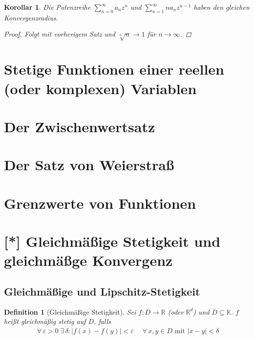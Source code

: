 \documentclass[11pt, twoside, a4paper]{article}
\theoremstyle{plain}
\newtheorem{definition}[blockelement]{Definition}
\newtheorem{korollar}[blockelement]{Korollar}
\newcommand{\abs}[1]{\left\lvert#1\right\rvert}
\newcommand{\fromto}{\rightarrow{}}
\newcommand{\sbset}{\subseteq}
\newcommand{\fa}{\;\forall\,}
\newcommand{\ex}{\;\exists\,}
\newcommand{\R}{\mathbb{R}}
\newcommand{\K}{\mathbb{K}}
\begin{document}
    \begin{korollar}
        Die Potenzreihe $ \sum_{n=0}^{\infty} a_n z^n$ und $ \sum_{n=1}^{\infty} n a_n z^{n-1}$ haben den gleichen Konvergenzradius.
        \begin{proof}
            Folgt mit vorherigem Satz und $\sqrt[n]{n}\fromto 1$ für $n\fromto\infty$.
        \end{proof}
    \end{korollar}

    \newpage


    \section{Stetige Funktionen einer reellen (oder komplexen) Variablen}
    


    \section{Der Zwischenwertsatz}
    


    \section{Der Satz von Weierstraß}
    


    \section{Grenzwerte von Funktionen}
    


    \section{[*] Gleichmäßige Stetigkeit und gleichmäßge Konvergenz}

    \subsection{Gleichmäßige und Lipschitz-Stetigkeit}
    \thispagestyle{pagenumberonly}

    \begin{definition}[Gleichmäßige Stetigkeit] %
        Sei $f: D\fromto \R$ (oder $\R^d$) und $D\sbset\K$. $f$ heißt gleichmäßig stetig auf $D$, falls
        \begin{align*}
            \fa\varepsilon > 0\ex\delta\colon \abs{f(x)-f(y)} < \varepsilon\quad\fa x,y\in D \text{ mit } \abs{x-y} < \delta
        \end{align*}
    \end{definition}
\end{document}
